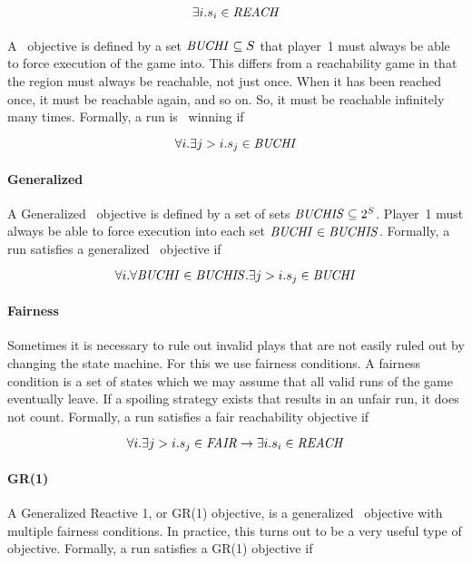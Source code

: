 \begin{equation}
\label{eqn:reachobj}
\exists i. s_i \in \mathit{REACH}
\end{equation}

\paragraph{\buchi}
A \buchi\ objective is defined by a set $\mathit{BUCHI} \subseteq S$ that player~1 must always be able to force execution of the game into. This differs from a reachability game in that the region must always be reachable, not just once. When it has been reached once, it must be reachable again, and so on. So, it must be reachable infinitely many times. Formally, a run is \buchi\ winning if 

\begin{equation}
\forall i. \exists j>i. s_j \in \mathit{BUCHI}
\end{equation}

\paragraph{Generalized \buchi}
A Generalized \buchi\ objective is defined by a set of sets $\mathit{BUCHIS} \subseteq 2^S$. Player~1 must always be able to force execution into each set $\mathit{BUCHI} \in \mathit{BUCHIS}$. Formally, a run satisfies a generalized \buchi\ objective if 

\begin{equation}
\forall i. \forall \mathit{BUCHI} \in \mathit{BUCHIS}. \exists j>i. s_j \in \mathit{BUCHI}
\end{equation}

\paragraph{Fairness}
Sometimes it is necessary to rule out invalid plays that are not easily ruled out by changing the state machine. For this we use fairness conditions. A fairness condition is a set of states which we may assume that all valid runs of the game eventually leave. If a spoiling strategy exists that results in an unfair run, it does not count. Formally, a run satisfies a fair reachability objective if 

\begin{equation}
\forall i. \exists j>i. s_j \in \mathit{FAIR} \rightarrow \exists i. s_i \in \mathit{REACH}
\end{equation}

\paragraph{GR(1)}
A Generalized Reactive 1, or GR(1) \cite{gr1} objective, is a generalized \buchi\ objective with multiple fairness conditions. In practice, this turns out to be a very useful type of objective. Formally, a run satisfies a GR(1) objective if 


